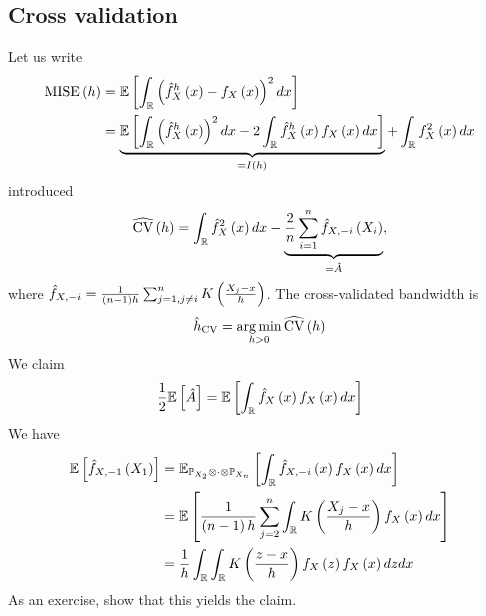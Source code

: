 \subsection{Cross validation}
Let us write
\begin{equation*}
	\begin{split}
		\mathrm{MISE}\left(h\right) &= \mathbb{E}\left[\int_{\mathbb{R}} \left(\hat{f}^h_X\left(x\right)-f_X\left(x\right) \right)^2dx\right]\\
		&= \underbrace{\mathbb{E}\left[\int_{\mathbb{R}} \left(\hat{f}^h_X \left(x\right)\right)^2 dx - 2\int_{\mathbb{R}} \hat{f}^h_X\left(x\right) f_X\left(x\right)dx \right]}_{=I\left(h\right)} + \int_{\mathbb{R}} f_X^2\left(x\right)dx
	\end{split}
\end{equation*}
introduced
\begin{equation*}
	\widehat{\mathrm{CV}}\left(h\right) = \int_{\mathbb{R}} \hat{f}_X^2 \left(x\right)dx - \underbrace{\frac{2}{n} \sum_{i=1}^n \hat{f}_{X,-i}\left(X_i\right)}_{=\hat{A}},
\end{equation*}
where $\hat{f}_{X,-i} = \frac{1}{\left(n-1\right)h} \sum_{j=1,j\neq i}^n K\left(\frac{X_j-x}{h}\right)$. The cross-validated bandwidth is
\begin{equation*}
	\hat{h}_{\mathrm{CV}} = \operatorname*{arg\,min}_{h>0 }\widehat{\mathrm{CV}}\left(h\right)
\end{equation*}
We claim
\begin{equation*}
	\frac{1}{2}\mathbb{E}\left[\hat{A}\right]= \mathbb{E}\left[\int_{\mathbb{R}} \hat{f}_X\left(x\right) f_X\left(x\right) dx\right]
\end{equation*}
We have
\begin{equation*}
	\begin{split}
		\mathbb{E}\left[\hat{f}_{X,-1}\left(X_1\right)\right] &= \mathbb{E}_{\mathbb{P}_{X_2}\otimes  \cdot\otimes \mathbb{P}_{X_n}}\left[\int_{\mathbb{R}} \hat{f}_{X,-i}\left(x\right)f_X\left(x\right) dx\right] \\
		&= \mathbb{E}\left[\frac{1}{\left(n-1\right) h}\sum_{j=2}^n \int_{\mathbb{R}} K\left(\frac{X_j-x}{h}\right)f_X\left(x\right) dx\right]\\
		&=\frac{1}{h} \int_{\mathbb{R}}\int_{\mathbb{R}} K\left(\frac{z-x}{h}\right) f_X\left(z\right) f_X\left(x\right) dz dx
	\end{split}
\end{equation*}
As an exercise, show that this yields the claim.

